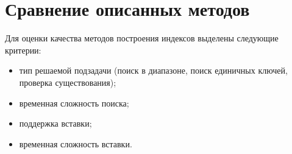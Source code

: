 

\section{Сравнение описанных методов\label{classification}}

Для оценки качества методов построения индексов выделены следующие критерии:
\begin{itemize}
    \item тип решаемой подзадачи (поиск в диапазоне, поиск единичных ключей,
        проверка существования);
    \item временная сложность поиска;
    \item поддержка вставки;
    \item временная сложность вставки.
\end{itemize}

